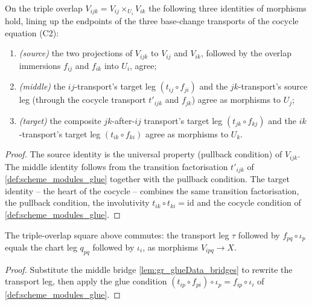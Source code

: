 \begin{lemma}

  \label{lem:gr_glueData_bridges}
  On the triple overlap \(V_{ijk} = V_{ij}\times_{U_i} V_{ik}\) the following three
  identities of morphisms hold, lining up the endpoints of the three base-change
  transports of the cocycle equation (C2):
  \begin{enumerate}
    \item \emph{(source)} the two projections of \(V_{ijk}\) to \(V_{ij}\) and \(V_{ik}\),
      followed by the overlap immersions \(f_{ij}\) and \(f_{ik}\) into \(U_i\),
      agree;
    \item \emph{(middle)} the \(ij\)-transport's target leg
      \((t_{ij}\circ f_{ji})\) and the \(jk\)-transport's source leg
      (through the cocycle transport \(t'_{ijk}\) and \(f_{jk}\)) agree as morphisms
      to \(U_j\);
    \item \emph{(target)} the composite \(jk\)-after-\(ij\) transport's target leg
      \((t_{jk}\circ f_{kj})\) and the \(ik\)-transport's target leg
      \((t_{ik}\circ f_{ki})\) agree as morphisms to \(U_k\).
  \end{enumerate}
\end{lemma}
\begin{proof}
  \leanok
  The source identity is the universal property (pullback condition) of \(V_{ijk}\).
  The middle identity follows from the transition factorisation
  \(t'_{ijk}\) of \cref{def:scheme_modules_glue} together with the pullback condition.
  The target identity -- the heart of the cocycle -- combines the same transition
  factorisation, the pullback condition, the involutivity \(t_{ik}\circ t_{ki}=\mathrm{id}\)
  and the cocycle condition of \cref{def:scheme_modules_glue}.
\end{proof}

\begin{lemma}

  \label{lem:gr_glueData_triple_square}
  The triple-overlap square above commutes: the transport leg \(\tau\) followed by
  \(f_{pq}\circ \iota_p\) equals the chart leg \(q_{pq}\) followed by \(\iota_i\), as
  morphisms \(V_{ipq}\to X\).
\end{lemma}
\begin{proof}
  \leanok
  Substitute the middle bridge \cref{lem:gr_glueData_bridges} to rewrite the transport
  leg, then apply the glue condition \((t_{ip}\circ f_{pi})\circ\iota_p =
  f_{ip}\circ\iota_i\) of \cref{def:scheme_modules_glue}.
\end{proof}

